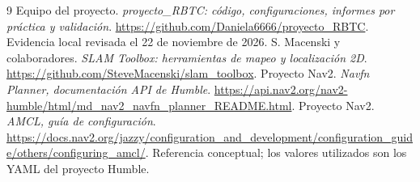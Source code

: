 \documentclass[11pt,a4paper]{article}
\begin{document}
\begin{thebibliography}{9}
 Equipo del proyecto. \emph{proyecto\_RBTC: código, configuraciones, informes por práctica y validación}. \url{https://github.com/Daniela6666/proyecto_RBTC}. Evidencia local revisada el 22 de noviembre de 2026.
 S. Macenski y colaboradores. \emph{SLAM Toolbox: herramientas de mapeo y localización 2D}. \url{https://github.com/SteveMacenski/slam_toolbox}.
 Proyecto Nav2. \emph{Navfn Planner, documentación API de Humble}. \url{https://api.nav2.org/nav2-humble/html/md_nav2_navfn_planner_README.html}.
 Proyecto Nav2. \emph{AMCL, guía de configuración}. \url{https://docs.nav2.org/jazzy/configuration_and_development/configuration_guide/others/configuring_amcl/}. Referencia conceptual; los valores utilizados son los YAML del proyecto Humble.
\end{thebibliography}
\end{document}
